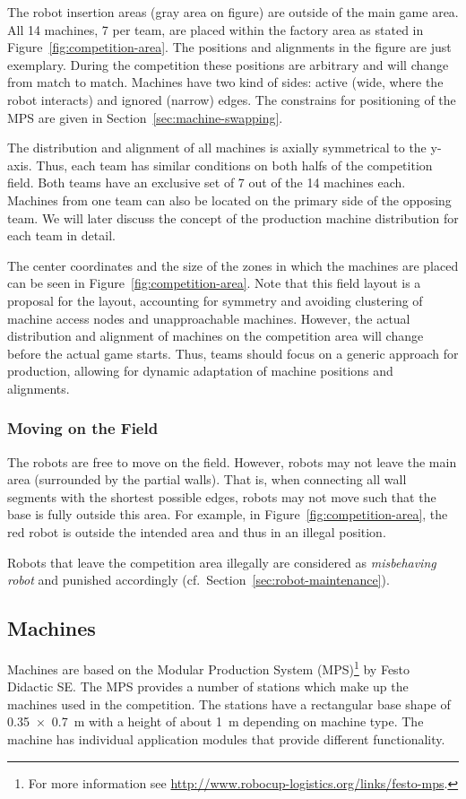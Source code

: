 \documentclass[12pt,twoside]{article}
\newcommand{\refsec}[1]{Section~\ref{#1}}
\newcommand{\reffig}[1]{Figure~\ref{#1}}
\begin{document}
The robot insertion areas (gray area on figure) are outside of the main
game area. All 14 machines, 7 per team, are placed within the factory
area as stated in \reffig{fig:competition-area}. The positions and
alignments in the figure are just exemplary. During the competition
these positions are arbitrary and will change from match to match.  Machines
have two kind of sides: active (wide, where the robot interacts) and
ignored (narrow) edges.
The constrains for positioning of the MPS are given in \refsec{sec:machine-swapping}.

The distribution and alignment of all machines is axially symmetrical
to the y-axis. Thus, each team has similar conditions on both halfs of
the competition field. Both teams have an exclusive set of 7 out of
the 14 machines each. Machines from one team can also be located on the
primary side of the opposing team. We will later discuss the concept
of the production machine distribution for each team in detail.

The center coordinates and the size of the zones in which the machines
are placed can be seen in \reffig{fig:competition-area}. Note that
this field layout is a proposal for the layout, accounting for
symmetry and avoiding clustering of machine access nodes and
unapproachable machines. However, the actual distribution and alignment 
of machines on the competition area will change before the actual game 
starts. Thus, teams should focus on a generic approach for production, 
allowing for dynamic adaptation of machine positions and alignments.

\subsubsection{Moving on the Field}
\label{sec:field-movement}
The robots are free to move on the field. However, robots may not
leave the main area (surrounded by the partial walls). That is, when
connecting all wall segments with the shortest possible edges, robots
may not move such that the base is fully outside this area. For
example, in \reffig{fig:competition-area}, the red robot is outside
the intended area and thus in an illegal position.

Robots that leave the competition area illegally are considered as
\emph{misbehaving robot} and punished accordingly
(cf.~\refsec{sec:robot-maintenance}).

\subsection{Machines}
\label{sec:machines}
Machines are based on the Modular Production System (MPS)\footnote{For
  more information see
  \url{http://www.robocup-logistics.org/links/festo-mps}.} by Festo
Didactic SE. The MPS provides a number of stations which
make up the machines used in the competition. The stations have a
rectangular base shape of \SI{0,35 x 0,7}{\metre} with a height of
about \SI{1}{\metre} depending on machine type. The machine
has individual application modules that provide different
functionality.
\end{document}
